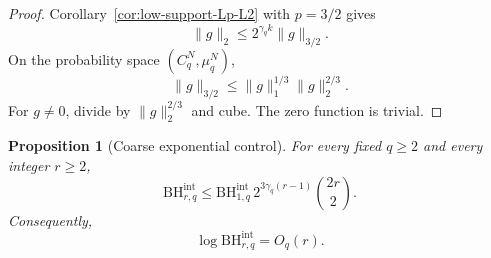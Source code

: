 \documentclass[11pt,a4paper]{article}
\numberwithin{equation}{section}
\theoremstyle{cleanplain}
\newtheorem{proposition}[proposition]{Proposition}
\theoremstyle{cleandefinition}
\theoremstyle{cleanremark}
\newcommand{\BHint}[2]{\mathrm{BH}^{\mathrm{int}}_{#1,#2}}
\begin{document}
\begin{proof}
Corollary~\ref{cor:low-support-Lp-L2} with $p=3/2$ gives
\[
 \|g\|_2\leq2^{\gamma_q k}\|g\|_{3/2}.
\]
On the probability space $(C_q^N,\mu_q^N)$,
\[
 \|g\|_{3/2}\leq\|g\|_1^{1/3}\|g\|_2^{2/3}.
\]
For $g\neq0$, divide by $\|g\|_2^{2/3}$ and cube.  The zero function is
trivial.
\end{proof}

\begin{proposition}[Coarse exponential control]\label{prop:coarse-bound}
For every fixed $q\geq2$ and every integer $r\geq2$,
\begin{equation}\label{eq:coarse-exponential}
 \BHint{r}{q}
 \leq
 \BHint{1}{q}\,2^{3\gamma_q(r-1)}\binom{2r}{2}.
\end{equation}
Consequently,
\begin{equation}\label{eq:coarse-bound-log}
 \log\BHint{r}{q}=O_q(r).
\end{equation}
\end{proposition}
\end{document}
